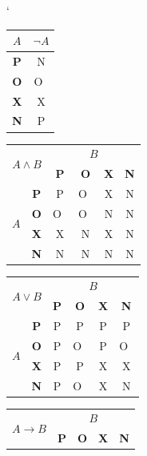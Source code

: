 \documentclass[11pt,a4paper]{article}
\begin{document}
	\begin{table}[h]
		\begin{center}
			\catcode`
			\hfill
			\begin{tabular}{|c|c|}
				\hline
				$A$			&	$\neg A$	\\	\hline
				\textbf{P}	&	N		\\	\hline
				\textbf{O}	&	O~\\	\hline
				\textbf{X}	&	X		\\	\hline
				\textbf{N}	&	P		\\	\hline
			\end{tabular}
			\hfil
			\begin{tabular}{|c|c|c|c|c|c|}
				\hline
				\multicolumn{2}{|c|}{\multirow{2}{*}{$A \wedge B$}}	& \multicolumn{4}{|c|}{$B$}			\\	\cline{3-6}
				\multicolumn{2}{|c|}{}				& \textbf{P} & \textbf{O} & \textbf{X} & \textbf{N}	\\	\hline
				\multirow{4}{*}{$A$}				& \textbf{P} & P & O~& X & N						\\	\cline{2-6}
													& \textbf{O} & O~& O~& N & N						\\	\cline{2-6}
													& \textbf{X} & X & N & X & N						\\	\cline{2-6}
													& \textbf{N} & N & N & N & N						\\	\hline
			\end{tabular}
			\hfil
			\begin{tabular}{|c|c|c|c|c|c|}
				\hline
				\multicolumn{2}{|c|}{\multirow{2}{*}{$A \vee B$}}	& \multicolumn{4}{|c|}{$B$}			\\	\cline{3-6}
				\multicolumn{2}{|c|}{}				& \textbf{P} & \textbf{O} & \textbf{X} & \textbf{N}	\\	\hline
				\multirow{4}{*}{$A$}				& \textbf{P} & P & P & P & P						\\	\cline{2-6}
													& \textbf{O} & P & O~& P & O~\\	\cline{2-6}
													& \textbf{X} & P & P & X & X						\\	\cline{2-6}
													& \textbf{N} & P & O~& X & N						\\	\hline
			\end{tabular}
			\hfil
			\begin{tabular}{|c|c|c|c|c|c|}
				\hline
				\multicolumn{2}{|c|}{\multirow{2}{*}{$A \rightarrow B$}}	& \multicolumn{4}{|c|}{$B$}	\\	\cline{3-6}
				\multicolumn{2}{|c|}{}				& \textbf{P} & \textbf{O} & \textbf{X} & \textbf{N}	\\	\hline

\end{tabular}
\end{center}
\end{table}
\end{document}
